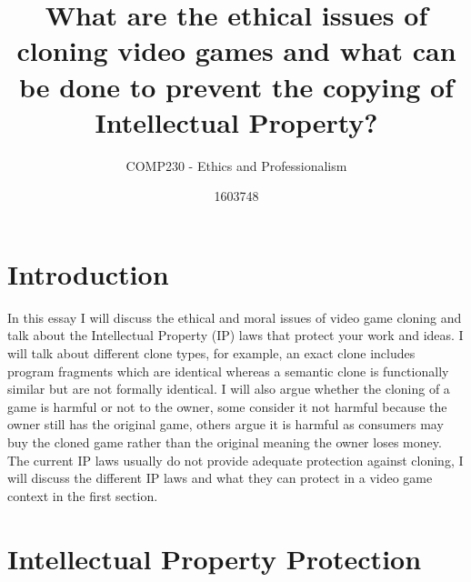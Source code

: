 \documentclass{scrartcl}
\title{What are the ethical issues of cloning video games and what can be done to prevent the copying of Intellectual Property?}
\subtitle{COMP230 - Ethics and Professionalism}
\author{1603748}
\begin{document}
\maketitle


\section*{Introduction}
 
In this essay I will discuss the ethical and moral issues of video game cloning and talk about the Intellectual Property (IP) laws that protect your work and ideas. I will talk about different clone types, for example, an exact clone includes program fragments which are identical whereas a semantic clone is functionally similar but are not formally identical. I will also argue whether the cloning of a game is harmful or not to the owner, some consider it not harmful because the owner still has the original game, others argue it is harmful as consumers may buy the cloned game rather than the original meaning the owner loses money. The current IP laws usually do not provide adequate protection against cloning, I will discuss the different IP laws and what they can protect in a video game context in the first section.

\section*{Intellectual Property Protection}
\end{document}
